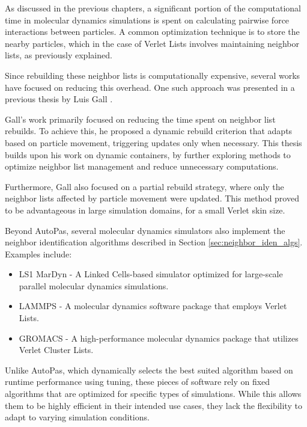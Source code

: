 As discussed in the previous chapters, a significant portion of the computational time in molecular dynamics simulations is spent on calculating pairwise force interactions between particles. A common optimization technique is to store the nearby particles, which in the case of Verlet Lists involves maintaining neighbor lists, as previously explained.

Since rebuilding these neighbor lists is computationally expensive, several works have focused on reducing this overhead. One such approach was presented in a previous thesis by Luis Gall \parencite{gall2023exploration}.

Gall's work primarily focused on reducing the time spent on neighbor list rebuilds. To achieve this, he proposed a dynamic rebuild criterion that adapts based on particle movement, triggering updates only when necessary. This thesis builds upon his work on dynamic containers, by further exploring methods to optimize neighbor list management and reduce unnecessary computations.

Furthermore, Gall also focused on a partial rebuild strategy, where only the neighbor lists affected by particle movement were updated. This method proved to be advantageous in large simulation domains, for a small Verlet skin size.


Beyond AutoPas, several molecular dynamics simulators also implement the neighbor identification algorithms described in Section \ref{sec:neighbor_iden_algs}. Examples include:

\begin{itemize}
    \item LS1 MarDyn - A Linked Cells-based simulator optimized for large-scale parallel molecular dynamics simulations. \parencite{niethammer2014ls1}
    \item LAMMPS - A molecular dynamics software package that employs Verlet Lists. \parencite{thompson2022lammps}
    \item GROMACS - A high-performance molecular dynamics package that utilizes Verlet Cluster Lists. \parencite{abraham2015gromacs}
\end{itemize}

Unlike AutoPas, which dynamically selects the best suited algorithm based on runtime performance using tuning, these pieces of software rely on fixed algorithms that are optimized for specific types of simulations. While this allows them to be highly efficient in their intended use cases, they lack the flexibility to adapt to varying simulation conditions.

